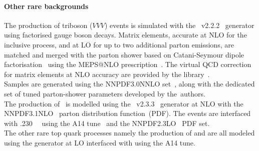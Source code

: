 \paragraph{Other rare backgrounds}
The production of triboson ($VVV$) events is simulated with the 
\sherpa~v2.2.2~\cite{Bothmann:2019yzt} generator using factorised gauge boson decays. 
Matrix elements, accurate at NLO for the inclusive process, and at LO for up to 
two additional parton emissions, are matched and merged with the \sherpa parton 
shower based on Catani-Seymour dipole factorisation~\cite{Gleisberg:2008fv,Schumann:2007mg} 
using the MEPS@NLO prescription~\cite{Hoeche:2011fd,Hoeche:2012yf,Catani:2001cc,Hoeche:2009rj}. 
The virtual QCD correction for matrix elements at NLO accuracy are 
provided by the \openloops library~\cite{Cascioli:2011va,Denner:2016kdg}.\\
Samples are generated using the \textsc{NNPDF3.0NNLO} set~\cite{Ball:2014uwa}, along with
the dedicated set of tuned parton-shower parameters developed by the~\sherpa authors.\\
The production of \tttt\ is modelled using the \mgamc~v2.3.3~\cite{Alwall:2014hca}
generator at NLO with the \textsc{NNPDF3.1NLO}~\cite{Ball:2014uwa} parton distribution function~(PDF).
The events are interfaced with \pythia.230~\cite{Sjostrand:2014zea}~ using the A14 tune~\cite{ATL-PHYS-PUB-2014-021} and the
\textsc{NNPDF2.3LO}~\cite{Ball:2014uwa} PDF set.\\
The other rare top quark processes namely the production of \ttWW and \ttt are all modeled using the \mgamc generator at LO interfaced with \pythia using the A14 tune.
